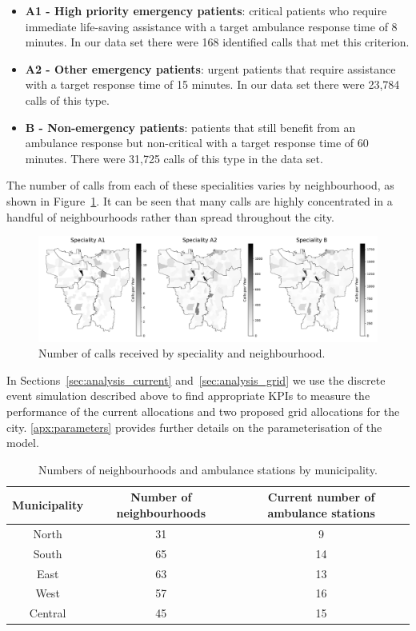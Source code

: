 \documentclass[preprint,12pt]{elsarticle}
\begin{document}
\begin{itemize}
  \item \textbf{A1 - High priority emergency patients}: critical patients who require immediate life-saving assistance with a target ambulance response time of 8 minutes.  In our data set there were 168 identified calls that met this criterion.
  \item \textbf{A2 - Other emergency patients}: urgent patients that require assistance with a target response time of 15 minutes. In our data set there were 23,784 calls of this type.
  \item \textbf{B - Non-emergency patients}: patients that still benefit from an ambulance response but non-critical with a target response time of 60 minutes. There were 31,725 calls of this type in the data set.
\end{itemize}

The number of calls from each of these specialities varies by neighbourhood, as shown in Figure~\ref{fig:yearly_demand}. It can be seen that many calls are highly concentrated in a handful of neighbourhoods rather than spread throughout the city.

\begin{figure}
\begin{center}
\includegraphics[width=\textwidth]{img/yearly_demand.pdf}
\end{center}
\caption{Number of calls received by speciality and neighbourhood.}
\label{fig:yearly_demand}
\end{figure}

In Sections~\ref{sec:analysis_current} and~\ref{sec:analysis_grid} we use the discrete event simulation described above to find appropriate KPIs to measure the performance of the current allocations and two proposed grid allocations for the city. \ref{apx:parameters} provides further details on the parameterisation of the model.

\begin{table}
\begin{center}
\begin{tabular}{ccc}
\toprule
Municipality & Number of neighbourhoods & Current number of ambulance stations \\
\midrule
North   & 31 & 9 \\
South   & 65 & 14 \\
East    & 63 & 13 \\
West    & 57 & 16 \\
Central & 45 & 15 \\
\bottomrule
\end{tabular}
\caption{Numbers of neighbourhoods and ambulance stations by municipality.}
\label{tbl:jakarta}
\end{center}
\end{table}
\end{document}
